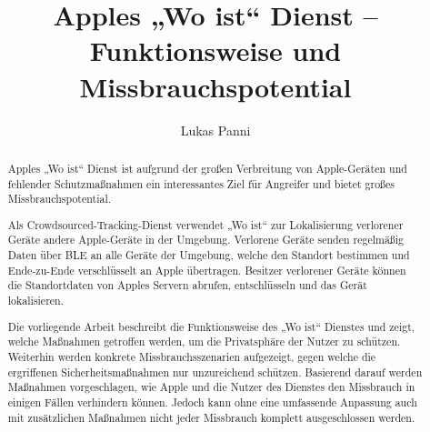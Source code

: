 \documentclass[runningheads]{llncs}
\begin{document}
\title{Apples „Wo ist“ Dienst – Funktionsweise und Missbrauchspotential}


\author{Lukas Panni}


\maketitle              %

\begin{abstract}
Apples „Wo ist“ Dienst ist aufgrund der großen Verbreitung von Apple-Geräten und fehlender Schutzmaßnahmen ein interessantes Ziel für Angreifer und bietet großes Missbrauchspotential.

Als Crowdsourced-Tracking-Dienst verwendet „Wo ist“ zur Lokalisierung verlorener Geräte andere Apple-Geräte in der Umgebung.
Verlorene Geräte senden regelmäßig Daten über \ac{BLE} an alle Geräte der Umgebung, welche den Standort bestimmen und Ende-zu-Ende verschlüsselt an Apple übertragen.
Besitzer verlorener Geräte können die Standortdaten von Apples Servern abrufen, entschlüsseln und das Gerät lokalisieren.

Die vorliegende Arbeit beschreibt die Funktionsweise des „Wo ist“ Dienstes und zeigt, welche Maßnahmen getroffen werden, um die Privatsphäre der Nutzer zu schützen.
Weiterhin werden konkrete Missbrauchsszenarien aufgezeigt, gegen welche die ergriffenen Sicherheitsmaßnahmen nur unzureichend schützen.
Basierend darauf werden Maßnahmen vorgeschlagen, wie Apple und die Nutzer des Dienstes den Missbrauch in einigen Fällen verhindern können.
Jedoch kann ohne eine umfassende Anpassung auch mit zusätzlichen Maßnahmen nicht jeder Missbrauch komplett ausgeschlossen werden.
\end{abstract}




\newpage




%





\end{document}

